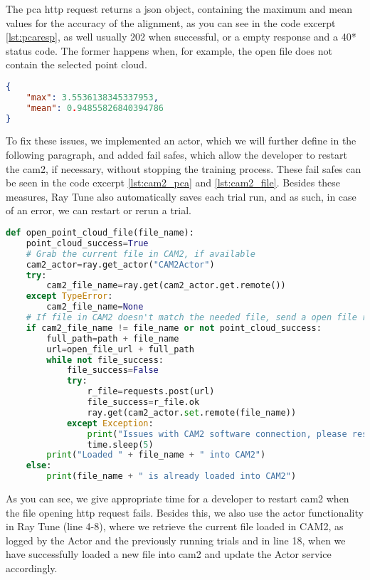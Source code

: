 The \acrshort{pca} \acrshort{http} request returns a \acrshort{json} object, containing the maximum and mean values for the accuracy of the alignment, as you can see in the code excerpt \ref{lst:pcaresp}, as well  usually 202 when successful, or a empty response and a 40* status code. The former happens when, for example, the open file does not contain the selected point cloud.

\begin{lstlisting}[language=json, caption=Example \acrshort{pca} \acrshort{http} request response, captionpos=b, label={lst:pcaresp}]
{
    "max": 3.5536138345337953,
    "mean": 0.94855826840394786
}
\end{lstlisting}

To fix these issues, we implemented an actor, which we will further define in the following paragraph, and added fail safes, which allow the developer to restart the \acrshort{cam2}, if necessary, without stopping the training process. These fail safes can be seen in the code excerpt \ref{lst:cam2_pca} and \ref{lst:cam2_file}. Besides these measures, Ray Tune also automatically saves each trial run, and as such, in case of an error, we can restart or rerun a trial.

\begin{lstlisting}[language=Python, caption=Opening a \acrshort{fcd} file in \acrshort{cam2}, captionpos=b, label={lst:cam2_pca}]
def open_point_cloud_file(file_name):
    point_cloud_success=True
    # Grab the current file in CAM2, if available
    cam2_actor=ray.get_actor("CAM2Actor")
    try:
        cam2_file_name=ray.get(cam2_actor.get.remote())
    except TypeError:
        cam2_file_name=None
    # If file in CAM2 doesn't match the needed file, send a open file request
    if cam2_file_name != file_name or not point_cloud_success:
        full_path=path + file_name
        url=open_file_url + full_path
        while not file_success:
            file_success=False
            try:
                r_file=requests.post(url)
                file_success=r_file.ok
                ray.get(cam2_actor.set.remote(file_name))
            except Exception:
                print("Issues with CAM2 software connection, please restart the CAM2 software.")
                time.sleep(5)
        print("Loaded " + file_name + " into CAM2")
    else:
        print(file_name + " is already loaded into CAM2")
\end{lstlisting}

As you can see, we give appropriate time for a developer to restart \acrshort{cam2} when the file opening \acrshort{http} request fails. Besides this, we also use the actor functionality in Ray Tune (line 4-8), where we retrieve the current file loaded in CAM2, as logged by the Actor and the previously running trials and in line 18, when we have successfully loaded a new file into \acrshort{cam2} and update the Actor service accordingly.

